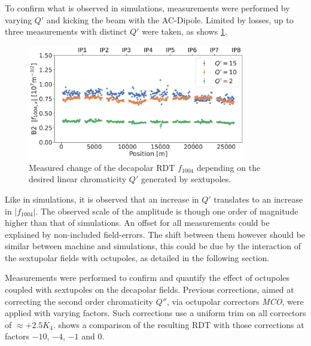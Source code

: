 To confirm what is observed in simulations, measurements were performed by varying $Q'$ and kicking
the beam with the AC-Dipole. Limited by losses, up to three measurements with distinct $Q'$ were
taken, as shows \cref{fig:decapoles:rdts:measured_f1004_from_sextupoles}.

\begin{figure}[!htb]
    \centering
    \includegraphics[width=0.85\textwidth]{./images/f1004/f1004x_q2_q10_q15.pdf}
    \caption{Measured change of the decapolar RDT $f_{1004}$ depending on the desired linear
    chromaticity $Q'$ generated by sextupoles.}
    \label{fig:decapoles:rdts:measured_f1004_from_sextupoles}
\end{figure}

Like in simulations, it is observed that an increase in $Q'$ translates to an increase in 
$|f_{1004}|$. The observed scale of the amplitude is though one order of magnitude higher than that
of simulations. An offset for all measurements could be explained by non-included field-errors. The
shift between them however should be similar between machine and simulations, this could be due by
the interaction of the sextupolar fields with octupoles, as detailed in the following section. 


Measurements were performed to confirm and quantify the effect of octupoles coupled with sextupoles
on the decapolar fields. Previous corrections, aimed at correcting the second order chromaticity
$Q''$, via octupolar correctors \textit{MCO}, were applied with varying factors. Such corrections
use a uniform trim on all correctors of $\approx +2.5K_4$.
 shows a comparison of the resulting RDT with those
corrections at factors $-10$, $-4$, $-1$ and $0$.

